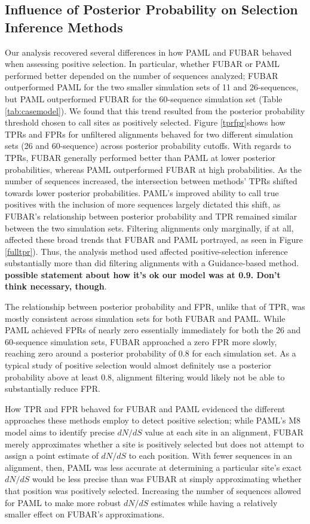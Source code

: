 \documentclass[10pt]{article}
\begin{document}
\subsection*{Influence of Posterior Probability on Selection Inference Methods}

Our analysis recovered several differences in how PAML and FUBAR behaved when assessing positive selection. In particular, whether FUBAR or PAML performed better depended on the number of sequences analyzed; FUBAR outperformed PAML for the two smaller simulation sets of 11 and 26-sequences, but PAML outperformed FUBAR for the 60-sequence simulation set (Table \ref{tab:casemodel}). We found that this trend resulted from the posterior probability threshold chosen to call sites as positively selected. Figure \ref{tprfpr}shows how TPRs and FPRs for unfiltered alignments behaved for two different simulation sets (26 and 60-sequence) across posterior probability cutoffs. With regards to TPRs,
FUBAR generally performed better than PAML at lower posterior probabilities, whereas PAML outperformed FUBAR at high probabilities. As the number of sequences increased, the intersection between methods' TPRs shifted towards lower posterior probabilities. PAML's improved ability to call true positives with the inclusion of more sequences largely dictated this shift, as FUBAR's relationship between posterior probability and TPR remained similar between the two simulation sets.  Filtering alignments only marginally, if at all, affected these broad trends that FUBAR and PAML portrayed, as seen in Figure \ref{fulltpr}). Thus, the analysis method used affected positive-selection inference substantially more than did filtering  alignments with a Guidance-based method. \textbf{possible statement about how it's ok our model was at 0.9. Don't think necessary, though}.

The relationship between posterior probability and FPR, unlike that of TPR, was mostly consistent across simulation sets for both FUBAR and PAML. While PAML achieved FPRs of nearly zero essentially immediately for both the 26 and 60-sequence simulation sets, FUBAR approached a zero FPR more slowly, reaching zero around a posterior probability of 0.8 for each simulation set. As a typical study of positive selection would almost definitely use a posterior probability above at least 0.8, alignment filtering would likely not be able to substantially reduce FPR.

How TPR and FPR behaved for FUBAR and PAML evidenced the different approaches these methods employ to detect positive selection; while PAML's M8 model aims to identify precise $dN/dS$ value at each site in an alignment, FUBAR merely approximates whether a site is positively selected but does not attempt to assign a point estimate of $dN/dS$ to each position. With fewer sequences in an alignment, then, PAML was less accurate at determining  a particular site's exact $dN/dS$ would be less precise than was FUBAR at simply approximating whether that position was positively selected. Increasing the number of sequences allowed for PAML to make more robust $dN/dS$ estimates while having a relatively smaller effect on FUBAR's approximations.
\end{document}
